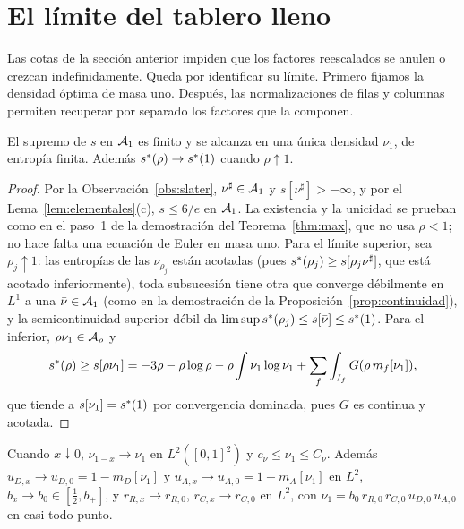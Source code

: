 \section{El límite del tablero lleno}\label{sec:limite}

Las cotas de la sección anterior impiden que los factores reescalados se anulen o crezcan
indefinidamente. Queda por identificar su límite. Primero fijamos la densidad óptima de
masa uno. Después, las normalizaciones de filas y columnas permiten recuperar por separado
los factores que la componen.

\begin{proposicion}\label{prop:masa_uno}
El supremo de $s$ en ${\mathcal{A}}_1$ es finito y se alcanza en una única densidad $\nu_1$, de entropía
finita. Además $s^{*}(\rho)\to s^{*}(1)$ cuando $\rho\uparrow1$.
\end{proposicion}

\begin{proof}
Por la Observación~\ref{obs:slater}, $\nu^\sharp\in{\mathcal{A}}_1$ y $s[\nu^\sharp]>-\infty$, y por el
Lema~\ref{lem:elementales}(c), $s\le6/e$ en ${\mathcal{A}}_1$. La existencia y la unicidad se prueban como en el
paso~1 de la demostración del Teorema~\ref{thm:max}, que no usa $\rho<1$; no hace falta una ecuación
de Euler en masa uno. Para el límite superior, sea $\rho_j\uparrow1$: las entropías de las
$\nu_{\rho_j}$ están acotadas (pues $s^{*}(\rho_j)\ge s[\rho_j\nu^\sharp]$, que está acotado
inferiormente), toda subsucesión tiene otra que converge débilmente en $L^1$ a una
$\bar\nu\in{\mathcal{A}}_1$ (como en la demostración de la Proposición~\ref{prop:continuidad}), y la
semicontinuidad superior débil da $\limsup s^{*}(\rho_j)\le s[\bar\nu]\le s^{*}(1)$. Para el inferior,
$\rho\nu_1\in{\mathcal{A}}_\rho$ y
\[
 s^{*}(\rho)\ge s[\rho\nu_1]=-3\rho-\rho\log\rho-\rho\int\nu_1\log\nu_1+\sum_f\int_{I_f}G(\rho\,m_f[\nu_1]),
\]
que tiende a $s[\nu_1]=s^{*}(1)$ por convergencia dominada, pues $G$ es continua y acotada.
\end{proof}

\begin{proposicion}[Convergencia en $L^2$]\label{prop:conv_L2}
Cuando $x\downarrow0$, $\nu_{1-x}\to\nu_1$ en $L^2([0,1]^2)$ y $c_\nu\le\nu_1\le C_\nu$. Además
$u_{D,x}\to u_{D,0}=1-m_D[\nu_1]$ y $u_{A,x}\to u_{A,0}=1-m_A[\nu_1]$ en $L^2$, $b_x\to b_0\in[\frac12,b_+]$,
y $r_{R,x}\to r_{R,0}$, $r_{C,x}\to r_{C,0}$ en $L^2$, con
$\nu_1=b_0\,r_{R,0}\,r_{C,0}\,u_{D,0}\,u_{A,0}$ en casi todo punto.
\end{proposicion}

